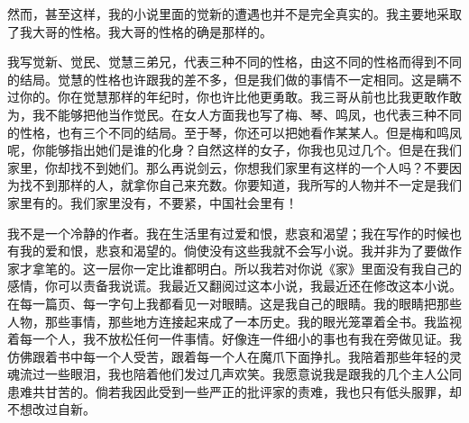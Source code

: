 \par 然而，甚至这样，我的小说里面的觉新的遭遇也并不是完全真实的。我主要地采取了我大哥的性格。我大哥的性格的确是那样的。
\par 我写觉新、觉民、觉慧三弟兄，代表三种不同的性格，由这不同的性格而得到不同的结局。觉慧的性格也许跟我的差不多，但是我们做的事情不一定相同。这是瞒不过你的。你在觉慧那样的年纪时，你也许比他更勇敢。我三哥从前也比我更敢作敢为，我不能够把他当作觉民。在女人方面我也写了梅、琴、鸣凤，也代表三种不同的性格，也有三个不同的结局。至于琴，你还可以把她看作某某人。但是梅和鸣凤呢，你能够指出她们是谁的化身？自然这样的女子，你我也见过几个。但是在我们家里，你却找不到她们。那么再说剑云，你想我们家里有这样的一个人吗？不要因为找不到那样的人，就拿你自己来充数。你要知道，我所写的人物并不一定是我们家里有的。我们家里没有，不要紧，中国社会里有！
\par 我不是一个冷静的作者。我在生活里有过爱和恨，悲哀和渴望；我在写作的时候也有我的爱和恨，悲哀和渴望的。倘使没有这些我就不会写小说。我并非为了要做作家才拿笔的。这一层你一定比谁都明白。所以我若对你说《家》里面没有我自己的感情，你可以责备我说谎。我最近又翻阅过这本小说，我最近还在修改这本小说。在每一篇页、每一字句上我都看见一对眼睛。这是我自己的眼睛。我的眼睛把那些人物，那些事情，那些地方连接起来成了一本历史。我的眼光笼罩着全书。我监视着每一个人，我不放松任何一件事情。好像连一件细小的事也有我在旁做见证。我仿佛跟着书中每一个人受苦，跟着每一个人在魔爪下面挣扎。我陪着那些年轻的灵魂流过一些眼泪，我也陪着他们发过几声欢笑。我愿意说我是跟我的几个主人公同患难共甘苦的。倘若我因此受到一些严正的批评家的责难，我也只有低头服罪，却不想改过自新。
